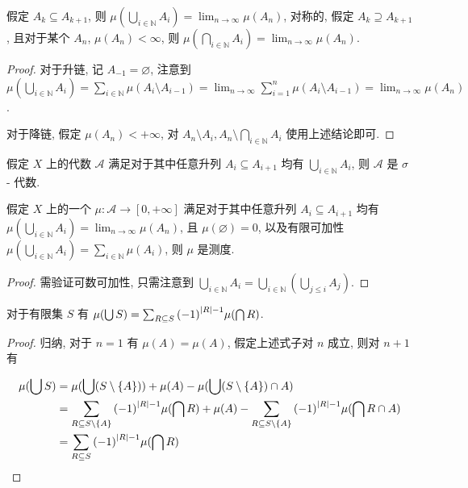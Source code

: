 \begin{lemma}
    假定 \(A_k \subseteq A_{k+1}\), 则 \(\mu(\bigcup_{i \in \mathbb{N}} A_i) = \lim_{n \to \infty} \mu(A_n)\),
    对称的, 假定 \(A_k \supseteq A_{k+1}\), 且对于某个 \(A_n\), \(\mu(A_n) < \infty\), 则 \(\mu(\bigcap_{i \in \mathbb{N}} A_i) = \lim_{n \to \infty} \mu(A_n)\).

    \begin{proof}
        对于升链, 记 \(A_{-1} = \varnothing\), 注意到 \(\mu(\bigcup_{i \in \mathbb{N}} A_i) = \sum_{i \in \mathbb{N}} \mu(A_i \setminus A_{i-1}) = \lim_{n \to \infty} \sum_{i=1}^n \mu(A_i \setminus A_{i-1}) = \lim_{n \to \infty} \mu(A_n)\).

        对于降链, 假定 \(\mu(A_n) < + \infty\), 对 \(A_n \setminus A_i,A_n \setminus \bigcap_{i \in \mathbb{N}} A_i\) 使用上述结论即可.
    \end{proof}
\end{lemma}

\begin{lemma}
    假定 \(X\) 上的代数 \(\mathcal{A}\) 满足对于其中任意升列 \(A_i \subseteq A_{i+1}\) 均有 \(\bigcup_{i \in \mathbb{N}} A_i\),
    则 \(\mathcal{A}\) 是 \(\sigma\) - 代数.
    
    假定 \(X\) 上的一个 \(\mu:\mathcal{A} \to [0, +\infty]\) 满足对于其中任意升列 \(A_i \subseteq A_{i+1}\) 均有 \(\mu(\bigcup_{i \in \mathbb{N}} A_i) = \lim_{n \to \infty} \mu(A_n)\),
    且 \(\mu(\varnothing) = 0\), 以及有限可加性 \(\mu(\bigcup_{i \in \mathbb{N}} A_i) = \sum_{i \in \mathbb{N}} \mu(A_i)\), 则 \(\mu\) 是测度.

    \begin{proof}
        需验证可数可加性, 只需注意到 \(\bigcup_{i \in \mathbb{N}} A_i = \bigcup_{i \in \mathbb{N}} (\bigcup_{j \leq i} A_j)\).
    \end{proof}
\end{lemma}

\begin{lemma}[容斥原理]
    对于有限集 \(S\) 有 \(\mu(\bigcup S) = \sum_{R \subseteq S} {(-1)}^{\abs{R} - 1} \mu(\bigcap R)\).

    \begin{proof}
        归纳, 对于 \(n = 1\) 有 \(\mu(A) = \mu(A)\), 假定上述式子对 \(n\) 成立, 则对 \(n+1\) 有
        
        \[
            \begin{aligned}
                \mu(\bigcup S) &= \mu(\bigcup (S \setminus \{A\})) + \mu(A) - \mu(\bigcup (S \setminus \{A\}) \cap A) \\
                &= \sum_{R \subseteq S \setminus \{A\}} {(-1)}^{\abs{R} - 1} \mu(\bigcap R) + \mu(A) - \sum_{R \subseteq S \setminus \{A\}} {(-1)}^{\abs{R} - 1} \mu(\bigcap R \cap A) \\
                &= \sum_{R \subseteq S} {(-1)}^{\abs{R} - 1} \mu(\bigcap R)
            \end{aligned}
        \]
    \end{proof}
\end{lemma}


